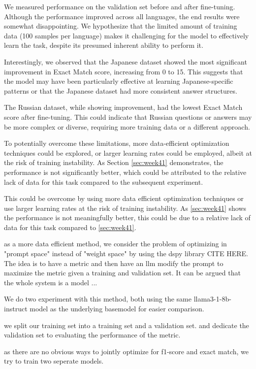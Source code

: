 \documentclass[11pt]{article}
\begin{document}
We measured performance on the validation set before and after fine-tuning. 
Although the performance improved across all languages, the end results were somewhat disappointing.
We hypothesize that the limited amount of training data (100 samples per language) makes it challenging for the model to effectively learn the task, despite its presumed inherent ability to perform it.

Interestingly, we observed that the Japanese dataset showed the most significant improvement in Exact Match score, increasing from 0 to 15. This suggests that the model may have been particularly effective at learning Japanese-specific patterns or that the Japanese dataset had more consistent answer structures.

The Russian dataset, while showing improvement, had the lowest Exact Match score after fine-tuning. This could indicate that Russian questions or answers may be more complex or diverse, requiring more training data or a different approach.

To potentially overcome these limitations, more data-efficient optimization techniques could be explored, or larger learning rates could be employed, albeit at the risk of training instability.
As Section \ref{sec:week41} demonstrates, the performance is not significantly better, which could be attributed to the relative lack of data for this task compared to the subsequent experiment.

This could be overcome by using more data efficient optimization techniques or use larger learning rates at the risk of training instability.
As \ref{sec:week41} shows the performance is not meaningfully better, this could be due to a relative lack of data for this task compared to \ref{sec:week41}.

as a more data efficient method, we consider the problem of optimizing in "prompt space" instead of "weight space" by using the dspy library CITE HERE. 
The idea is to have a metric and then have an llm modify the prompt to maximize the metric given a training and validation set. 
It can be argued that the whole system is a model ... 

We do two experiment with this method, both using the same llama3-1-8b-instruct model as the underlying basemodel for easier comparison.

we split our training set into a training set and a validation set. and dedicate the validation set to evaluating the performance of the metric.

as there are no obvious ways to jointly optimize for f1-score and exact match, we try to train two seperate models.
\end{document}
